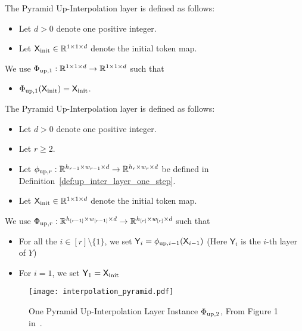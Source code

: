 \begin{definition}[Pyramid Up-Interpolation Layer $\Phi_{{\rm}}$, $r=1$ Case]\label{def:pyramid_up_interpolation_layer_r1}
The Pyramid Up-Interpolation layer is defined as follows:
\begin{itemize}
    \item Let $d > 0$ denote one positive integer.
    \item  Let $\mathsf{X}_{\mathrm{init}} \in \mathbb{R}^{1\times 1 \times d}$ denote the initial token map.
\end{itemize}
We use $\Phi_{{\rm up}, 1} : \mathbb{R}^{ 1 \times 1 \times d} \to \mathbb{R}^{1 \times 1 \times d}$ such that
\begin{itemize}
    \item $\Phi_{\mathrm{up}, 1}(\mathsf{X}_{\mathrm{init}}) = \mathsf{X}_{\mathrm{init}}$.
\end{itemize}
\end{definition}

\begin{definition}\label{def:pyramid_up_interpolation_layer}
The Pyramid Up-Interpolation layer is defined as follows:
\begin{itemize}
    \item Let $d > 0$ denote one positive integer.
    \item Let $r \geq 2$.
    \item Let $\phi_{{\rm up},r}: \mathbb{R}^{ h_{r-1} \times w_{r-1} \times d} \to \mathbb{R}^{h_{r} \times w_{r} \times d}$ be defined in Definition~\ref{def:up_inter_layer_one_step}.
    \item  Let $\mathsf{X}_{\mathrm{init}} \in \mathbb{R}^{1\times 1 \times d}$ denote the initial token map.
\end{itemize}
We use $\Phi_{{\rm up}, r} : \mathbb{R}^{ h_{[r-1]} \times w_{[r-1]} \times d} \to \mathbb{R}^{h_{[r]} \times w_{[r]} \times d}$ such that
\begin{itemize}
    \item For all the $i \in [r] \setminus \{1\}$, we set $\mathsf{Y}_{i} = \phi_{{\rm up}, {i-1}} ( \mathsf{X}_{i-1} )$ (Here $\mathsf{Y}_i$ is the $i$-th layer of $Y$)
    \item For $i = 1$, we set $\mathsf{Y}_1 = \mathsf{X}_{\mathrm{init}}$
\end{itemize}
\end{definition}

\begin{figure}[!ht]\label{fig:iteration_trajectory}
    \centering
    \texttt{[image: interpolation\_pyramid.pdf]}
    \caption{ One Pyramid Up-Interpolation Layer Instance $\Phi_{{\rm up},2}$, From Figure 1 in~\cite{kll+25}.}
    \label{fig:trajectory}
\end{figure}

